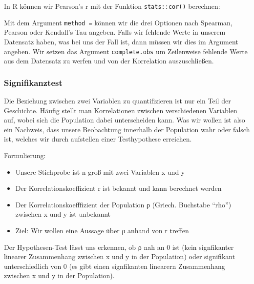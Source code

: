 \documentclass[
]{article}
\newenvironment{Shaded}{\begin{snugshade}}{\end{snugshade}}
\newcommand{\AttributeTok}[1]{\textcolor[rgb]{0.77,0.63,0.00}{#1}}
\newcommand{\DocumentationTok}[1]{\textcolor[rgb]{0.56,0.35,0.01}{\textbf{\textit{#1}}}}
\newcommand{\FunctionTok}[1]{\textcolor[rgb]{0.00,0.00,0.00}{#1}}
\newcommand{\NormalTok}[1]{#1}
\newcommand{\SpecialCharTok}[1]{\textcolor[rgb]{0.00,0.00,0.00}{#1}}
\newcommand{\StringTok}[1]{\textcolor[rgb]{0.31,0.60,0.02}{#1}}
\providecommand{\tightlist}{%
  \setlength{\itemsep}{0pt}\setlength{\parskip}{0pt}}
\begin{document}
In R können wir Pearson's r mit der Funktion \texttt{stats::cor()} berechnen:

\begin{Shaded}
\end{Shaded}

Mit dem Argument \texttt{method\ =} können wir die drei Optionen nach Spearman, Pearson oder Kendall's Tau angeben. Falls wir fehlende Werte in unserem Datensatz haben, was bei uns der Fall ist, dann müssen wir dies im Argument angeben. Wir setzen das Argument \texttt{complete.obs} um Zeilenweise fehlende Werte aus dem Datensatz zu werfen und von der Korrelation auszuschließen.

\hypertarget{signifikanztest}{%
\subsubsection{Signifikanztest}\label{signifikanztest}}

Die Beziehung zwischen zwei Variablen zu quantifizieren ist nur ein Teil der Geschichte. Häufig stellt man Korrelationen zwischen verschiedenen Variablen auf, wobei sich die Population dabei unterscheiden kann. Was wir wollen ist also ein Nachweis, dass unsere Beobachtung innerhalb der Population wahr oder falsch ist, welches wir durch aufstellen einer Testhypothese erreichen.

Formulierung:

\begin{itemize}
\tightlist
\item
  Unsere Stichprobe ist n groß mit zwei Variablen x und y
\item
  Der Korrelationskoeffizient r ist bekannt und kann berechnet werden
\item
  Der Korrelationskoefffizient der Population ρ (Griech. Buchstabe ``rho'') zwischen x und y ist unbekannt
\item
  Ziel: Wir wollen eine Aussage über ρ anhand von r treffen
\end{itemize}

Der Hypothesen-Test lässt uns erkennen, ob ρ nah an 0 ist (kein signfikanter linearer Zusammenhang zwischen x und y in der Population) oder signifikant unterschiedlich von 0 (es gibt einen signfikanten linearern Zusammenhang zwischen x und y in der Population).
\end{document}
